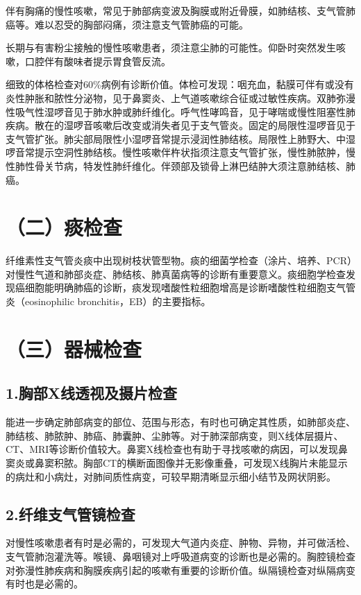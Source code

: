 伴有胸痛的慢性咳嗽，常见于肺部病变波及胸膜或附近骨膜，如肺结核、支气管肺癌等。难以忍受的胸部闷痛，须注意支气管肺癌的可能。

长期与有害粉尘接触的慢性咳嗽患者，须注意尘肺的可能性。仰卧时突然发生咳嗽，口腔伴有酸味者提示胃食管反流。

细致的体格检查对60\%病例有诊断价值。体检可发现：咽充血，黏膜可伴有或没有炎性肿胀和脓性分泌物，见于鼻窦炎、上气道咳嗽综合征或过敏性疾病。双肺弥漫性吸气性湿啰音见于肺水肿或肺纤维化。呼气性哮鸣音，见于哮喘或慢性阻塞性肺疾病。散在的湿啰音咳嗽后改变或消失者见于支气管炎。固定的局限性湿啰音见于支气管扩张。肺尖部局限性小湿啰音常提示浸润性肺结核。局限性上肺野大、中湿啰音常提示空洞性肺结核。慢性咳嗽伴杵状指须注意支气管扩张，慢性肺脓肿，慢性肺性骨关节病，特发性肺纤维化。伴颈部及锁骨上淋巴结肿大须注意肺结核、肺癌。

\section{（二）痰检查}

纤维素性支气管炎痰中出现树枝状管型物。痰的细菌学检查（涂片、培养、PCR）对慢性气道和肺部炎症、肺结核、肺真菌病等的诊断有重要意义。痰细胞学检查发现癌细胞能明确肺癌的诊断，痰发现嗜酸性粒细胞增高是诊断嗜酸性粒细胞支气管炎（eosinophilic
bronchitis，EB）的主要指标。

\section{（三）器械检查}

\subsection{1.胸部X线透视及摄片检查}

能进一步确定肺部病变的部位、范围与形态，有时也可确定其性质，如肺部炎症、肺结核、肺脓肿、肺癌、肺囊肿、尘肺等。对于肺深部病变，则X线体层摄片、CT、MRI等诊断价值较大。鼻窦X线检查也有助于寻找咳嗽的病因，可以发现鼻窦炎或鼻窦积脓。胸部CT的横断面图像并无影像重叠，可发现X线胸片未能显示的病灶和小病灶，对肺间质性病变，可较早期清晰显示细小结节及网状阴影。

\subsection{2.纤维支气管镜检查}

对慢性咳嗽患者有时是必需的，可发现大气道内炎症、肿物、异物，并可做活检、支气管肺泡灌洗等。喉镜、鼻咽镜对上呼吸道病变的诊断也是必需的。胸腔镜检查对弥漫性肺疾病和胸膜疾病引起的咳嗽有重要的诊断价值。纵隔镜检查对纵隔病变有时也是必需的。

